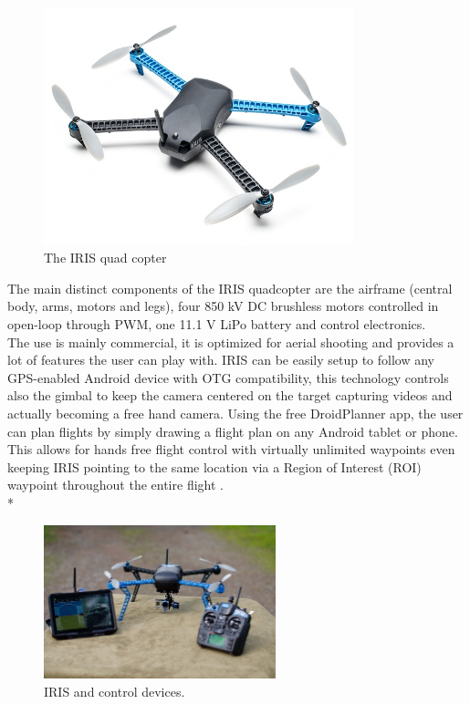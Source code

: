 \begin{figure}[h]
\centering
 \noindent
 \includegraphics[width=0.8\textwidth]{iris.jpg}
 \caption{The IRIS quad copter}
 \label{figure:iris}
\end{figure}

The main distinct components of the IRIS quadcopter are the airframe (central body, arms, motors and legs), four 850 kV DC brushless motors controlled in open-loop through PWM, one 11.1 V LiPo battery and control electronics.\\ 
The use is mainly commercial, it is optimized for aerial shooting and provides a lot of features the user can play with. IRIS can be easily setup to follow any GPS-enabled Android device with OTG compatibility, this technology controls also the gimbal to keep the camera centered on the target capturing videos and actually becoming a free hand camera. Using the free DroidPlanner app, the user can plan flights by simply drawing a flight plan on any Android tablet or phone. This allows for hands free flight control with virtually unlimited waypoints even keeping IRIS pointing to the same location via a Region of Interest (ROI) waypoint throughout the entire flight \cite{IRIS}. \\*


\begin{figure}[h]
 \centering
 \includegraphics[width=0.6\textwidth]{iris_planner.jpg}
 \caption[IRIS and control devices]{IRIS and control devices.}
 \label{figure:iris_planner}
\end{figure}


